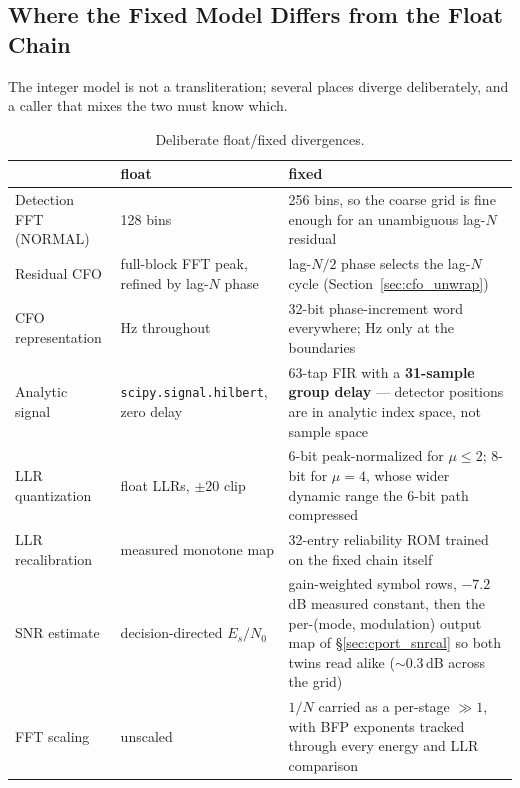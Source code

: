 \subsection{Where the Fixed Model Differs from the Float Chain}
\label{sec:fixed_vs_float}

The integer model is not a transliteration; several places diverge
deliberately, and a caller that mixes the two must know which.

\begin{table}[H]
    \centering
    \caption{Deliberate float/fixed divergences.}
    \label{tab:fixed_vs_float}
    \begin{tabular}{p{}p{}p{}}
        \toprule
        & float & fixed \\
        \midrule
        Detection FFT (NORMAL) & 128 bins &
            256 bins, so the coarse grid is fine enough for an
            unambiguous lag-$N$ residual \\
        Residual CFO & full-block FFT peak, refined by lag-$N$ phase &
            lag-$N/2$ phase selects the lag-$N$ cycle
            (Section~\ref{sec:cfo_unwrap}) \\
        CFO representation & Hz throughout &
            32-bit phase-increment word everywhere; Hz only at the
            boundaries \\
        Analytic signal & \texttt{scipy.signal.hilbert}, zero delay &
            63-tap FIR with a \textbf{31-sample group delay} --- detector
            positions are in analytic index space, not sample space \\
        LLR quantization & float LLRs, $\pm20$ clip &
            6-bit peak-normalized for $\mu\le2$; 8-bit for $\mu=4$,
            whose wider dynamic range the 6-bit path compressed \\
        LLR recalibration & measured monotone map &
            32-entry reliability ROM trained on the fixed chain itself \\
        SNR estimate & decision-directed $E_s/N_0$ &
            gain-weighted symbol rows, $-7.2$\,dB measured constant,
            then the per-(mode, modulation) output map of
            \S\ref{sec:cport_snrcal} so both twins read alike
            ($\sim$0.3\,dB across the grid) \\
        FFT scaling & unscaled &
            $1/N$ carried as a per-stage $\gg 1$, with BFP exponents
            tracked through every energy and LLR comparison \\
        \bottomrule
    \end{tabular}
\end{table}

